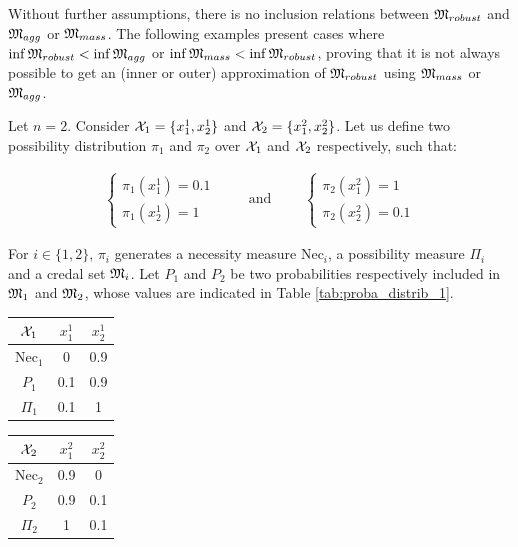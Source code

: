 Without further assumptions, there is no inclusion relations between ${\mathfrak{M}}_{robust}$ and ${\mathfrak{M}}_{agg}$ or ${\mathfrak{M}}_{mass}$. The following examples present cases where $\inf{\mathfrak{M}}_{robust}<\inf{\mathfrak{M}}_{agg}$ or $\inf{\mathfrak{M}}_{mass}<\inf{\mathfrak{M}}_{robust}$, proving that it is not always possible to get an (inner or outer) approximation of ${\mathfrak{M}}_{robust}$ using ${\mathfrak{M}}_{mass}$ or ${\mathfrak{M}}_{agg}$.

\begin{example}\label{ex:necessity}
    Let $n=2$. Consider ${\mathcal{X}}_1=\{x^1_1, x^1_2\}$ and ${\mathcal{X}}_2=\{x^2_1, x^2_2\}$. Let us define two possibility distribution $\pi_1$ and $\pi_2$ over ${\mathcal{X}}_1$ and ${\mathcal{X}}_2$ respectively, such that:

    \begin{eqnarray*}
    \begin{cases}
        \pi_1(x^1_1) = 0.1\\
        \pi_1(x^1_2) = 1
    \end{cases}
    \qquad\text{ and }\qquad
    \begin{cases}
        \pi_2(x^2_1)=1\\
        \pi_2(x^2_2)=0.1
    \end{cases}
    \end{eqnarray*}
    
    For $i\in\{1,2\}$, $\pi_i$ generates a necessity measure $\mathrm{Nec}_i$, a possibility measure $\Pi_i$ and a credal set ${\mathfrak{M}}_i$. Let $P_1$ and $P_2$ be two probabilities respectively included in ${\mathfrak{M}}_1$ and ${\mathfrak{M}}_2$,  whose values are indicated in Table \ref{tab:proba_distrib_1}. 
    
    \begin{center}
    \begin{tabular}{|c|c|c|}
        \hline
        ${\mathcal{X}}_1$ & $x^1_1$ & $x^1_2$\\
        \hline\hline
        $\mathrm{Nec}_1$ & 0 & 0.9\\
        \hline
        $P_1$  & 0.1 & 0.9\\
        \hline
        $\Pi_1$ & 0.1 & 1\\
        \hline
    \end{tabular}
    \quad
    \begin{tabular}{|c|c|c|}
        \hline
        ${\mathcal{X}}_2$ & $x^2_1$ & $x^2_2$\\
        \hline\hline
        $\mathrm{Nec}_2$ & 0.9 & 0\\
        \hline
        $P_2$  & 0.9 & 0.1\\
        \hline
        $\Pi_2$ & 1 & 0.1\\
        \hline
    \end{tabular}
    \label{tab:proba_distrib_1}
    \end{center}


\end{example}
